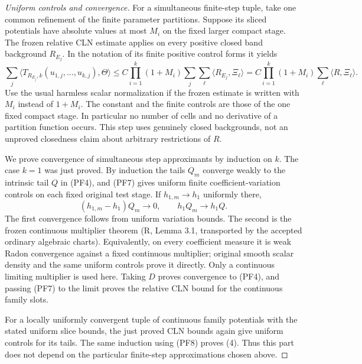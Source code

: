 \documentclass[11pt,a4paper]{article}
\numberwithin{equation}{section}
\theoremstyle{definition}
\theoremstyle{remark}
\begin{document}
\begin{proof}[Uniform controls and convergence]
For a simultaneous finite-step tuple, take one common refinement of
the finite parameter partitions. Suppose its sliced potentials have
absolute values at most $M_i$ on the fixed larger compact stage.
The frozen relative CLN estimate applies on every positive closed
band background $R_{E_j}$. In the notation of its finite positive
control forms it yields
\[
 \sum_j\bigl\langle
       T_{R_{E_j},k}(u_{1,j},\ldots,u_{k,j}),\Theta\bigr\rangle
   \le C\prod_{i=1}^k(1+M_i)
                        \sum_j\sum_\ell\langle R_{E_j},\Xi_\ell\rangle
   = C\prod_{i=1}^k(1+M_i)\sum_\ell\langle R,\Xi_\ell\rangle.
 \tag{PF7}
\]
Use the usual harmless scalar normalization if the frozen estimate
is written with $M_i$ instead of $1+M_i$. The constant and the
finite controls are those of the one fixed compact stage. In
particular no number of cells and no derivative of a partition
function occurs. This step uses genuinely closed backgrounds,
not an unproved closedness claim about arbitrary restrictions of $R$.

We prove convergence of simultaneous step approximants by induction
on $k$. The case $k=1$ was just proved. By induction the tails
$Q_m$ converge weakly to the intrinsic tail $Q$ in (PF4), and
(PF7) gives uniform finite coefficient-variation controls on each
fixed original test stage. If $h_{1,m}\to h_1$ uniformly there,
\[
             (h_{1,m}-h_1)Q_m\longrightarrow0,
                   \qquad h_1Q_m\longrightarrow h_1Q.
 \tag{PF8}
\]
The first convergence follows from uniform variation bounds. The
second is the frozen continuous multiplier theorem (R, Lemma 3.1,
transported by the accepted ordinary algebraic charts). Equivalently,
on every coefficient measure it is weak Radon convergence against
a fixed continuous multiplier; original smooth scalar density and
the same uniform controls prove it directly. Only a continuous
limiting multiplier is used here. Taking $D$ proves convergence
to (PF4), and passing (PF7) to the limit proves the relative CLN
bound for the continuous family slots.

For a locally uniformly convergent tuple of continuous family
potentials with the stated uniform slice bounds, the just proved
CLN bounds again give uniform controls for its tails. The same
induction using (PF8) proves (4).
Thus this part does not depend on the particular finite-step
approximations chosen above.
\end{proof}
\end{document}
